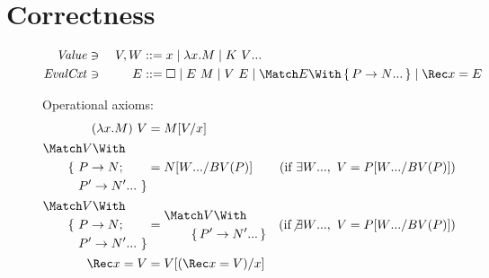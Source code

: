 \documentclass[runningheads]{llncs}
\begin{document}
\section{Correctness}

\begin{figure}
\centering
  
\begin{alignat*}{2}
  \mathit{Value} &\ni{}& V, W
  &::= x
  \mid \lambda x. M
  \mid K~\many{V}
  \\
  \mathit{EvalCxt} &\ni{}& E
  &::= \hole
  \mid E ~ M
  \mid V ~ E
  \mid \Match E \With \set{\many{P \to N}}
  \mid \Rec x = E
\end{alignat*}

Operational axioms:
\begin{align*}
  (\lambda x. M) ~ V
  &=
  M\subst{x}{V}
  \\
  \begin{aligned}
    &\Match V \With \\
    &\qquad
    \begin{aligned}[t]
    \{~ &P \to N; \\
    &\many{P' \to N'}~\}
    \end{aligned}
  \end{aligned}
  &=
  N\subst{BV(P)}{\many{W}}
  &(\text{if } \exists \many{W},~ V &= P\subst{BV(P)}{\many{W}})
  \\
  \begin{aligned}
    &\Match V \With \\
    &\qquad
    \begin{aligned}[t]
    \{~ &P \to N; \\
    &\many{P' \to N'}~\}
    \end{aligned}
  \end{aligned}
  &=
  \begin{aligned}
    &\Match V \With \\
    &\qquad \set{\many{P' \to N'}}
  \end{aligned}
  &(\text{if}\!\not\exists \many{W},~ V &= P\subst{BV(P)}{\many{W}})
  \\
  \Rec x = V
  &=
  V\subst{x}{(\Rec x = V)}
\end{align*}


\end{figure}
\end{document}
